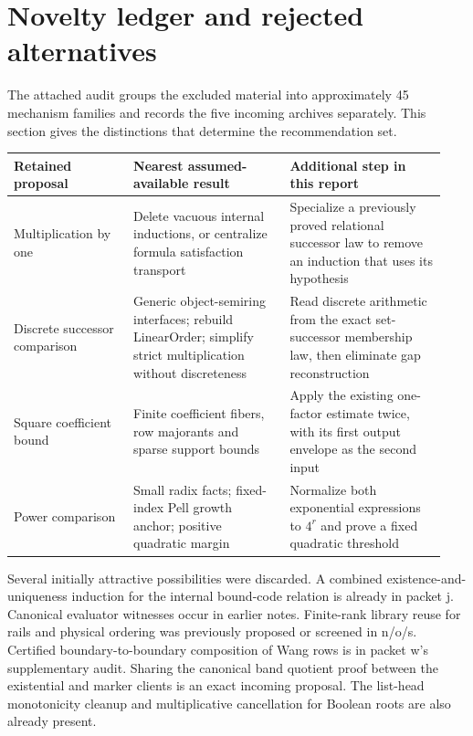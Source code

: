 \documentclass[11pt,letterpaper]{article}
\begin{document}
\section{Novelty ledger and rejected alternatives}

The attached audit groups the excluded material into approximately 45 mechanism families and records the five incoming archives separately. This section gives the distinctions that determine the recommendation set.

\begin{longtable}{@{}>{\raggedright\arraybackslash}p{0.26\linewidth}>{\raggedright\arraybackslash}p{0.34\linewidth}>{\raggedright\arraybackslash}p{0.34\linewidth}@{}}
\toprule
Retained proposal & Nearest assumed-available result & Additional step in this report\\
\midrule
\endhead
Multiplication by one & Delete vacuous internal inductions, or centralize formula satisfaction transport & Specialize a previously proved relational successor law to remove an induction that uses its hypothesis\\
Discrete successor comparison & Generic object-semiring interfaces; rebuild LinearOrder; simplify strict multiplication without discreteness & Read discrete arithmetic from the exact set-successor membership law, then eliminate gap reconstruction\\
Square coefficient bound & Finite coefficient fibers, row majorants and sparse support bounds & Apply the existing one-factor estimate twice, with its first output envelope as the second input\\
Power comparison & Small radix facts; fixed-index Pell growth anchor; positive quadratic margin & Normalize both exponential expressions to $4^r$ and prove a fixed quadratic threshold\\
\bottomrule
\end{longtable}

Several initially attractive possibilities were discarded. A combined existence-and-uniqueness induction for the internal bound-code relation is already in packet j. Canonical evaluator witnesses occur in earlier notes. Finite-rank library reuse for rails and physical ordering was previously proposed or screened in n/o/s. Certified boundary-to-boundary composition of Wang rows is in packet w's supplementary audit. Sharing the canonical band quotient proof between the existential and marker clients is an exact incoming proposal. The list-head monotonicity cleanup and multiplicative cancellation for Boolean roots are also already present.
\end{document}
